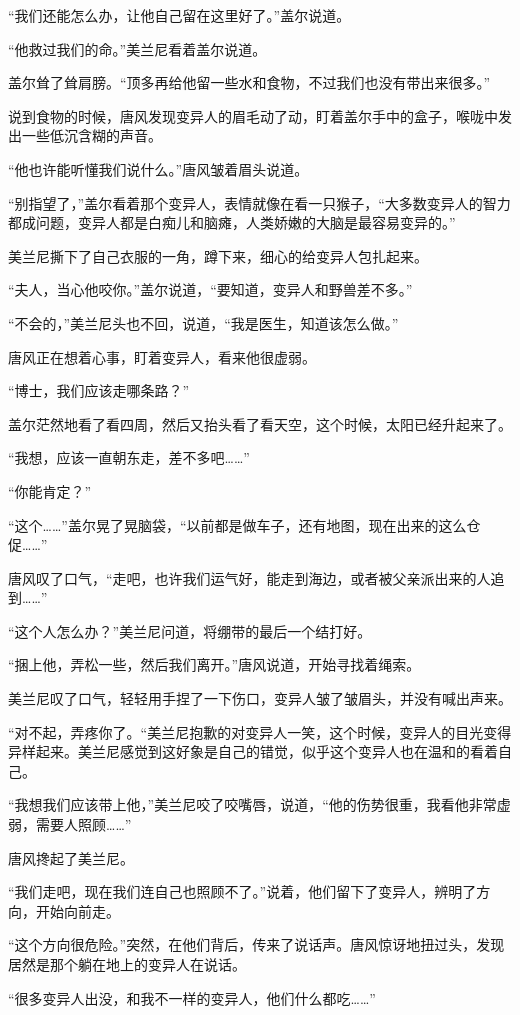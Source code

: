 “我们还能怎么办，让他自己留在这里好了。”盖尔说道。

“他救过我们的命。”美兰尼看着盖尔说道。

盖尔耸了耸肩膀。“顶多再给他留一些水和食物，不过我们也没有带出来很多。”

说到食物的时候，唐风发现变异人的眉毛动了动，盯着盖尔手中的盒子，喉咙中发出一些低沉含糊的声音。

“他也许能听懂我们说什么。”唐风皱着眉头说道。

“别指望了，”盖尔看着那个变异人，表情就像在看一只猴子，“大多数变异人的智力都成问题，变异人都是白痴儿和脑瘫，人类娇嫩的大脑是最容易变异的。”

美兰尼撕下了自己衣服的一角，蹲下来，细心的给变异人包扎起来。

“夫人，当心他咬你。”盖尔说道，“要知道，变异人和野兽差不多。”

“不会的，”美兰尼头也不回，说道，“我是医生，知道该怎么做。”

唐风正在想着心事，盯着变异人，看来他很虚弱。

“博士，我们应该走哪条路？”

盖尔茫然地看了看四周，然后又抬头看了看天空，这个时候，太阳已经升起来了。

“我想，应该一直朝东走，差不多吧……”

“你能肯定？”

“这个……”盖尔晃了晃脑袋，“以前都是做车子，还有地图，现在出来的这么仓促……”

唐风叹了口气，“走吧，也许我们运气好，能走到海边，或者被父亲派出来的人追到……”

“这个人怎么办？”美兰尼问道，将绷带的最后一个结打好。

“捆上他，弄松一些，然后我们离开。”唐风说道，开始寻找着绳索。

美兰尼叹了口气，轻轻用手捏了一下伤口，变异人皱了皱眉头，并没有喊出声来。

“对不起，弄疼你了。“美兰尼抱歉的对变异人一笑，这个时候，变异人的目光变得异样起来。美兰尼感觉到这好象是自己的错觉，似乎这个变异人也在温和的看着自己。

“我想我们应该带上他，”美兰尼咬了咬嘴唇，说道，“他的伤势很重，我看他非常虚弱，需要人照顾……”

唐风搀起了美兰尼。

“我们走吧，现在我们连自己也照顾不了。”说着，他们留下了变异人，辨明了方向，开始向前走。

“这个方向很危险。”突然，在他们背后，传来了说话声。唐风惊讶地扭过头，发现居然是那个躺在地上的变异人在说话。

“很多变异人出没，和我不一样的变异人，他们什么都吃……”

